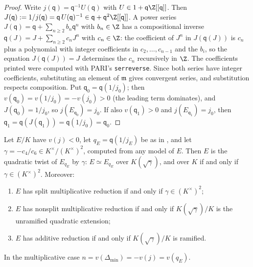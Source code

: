 \begin{proof}
Write $j(\mathsf q)=\mathsf q^{-1}U(\mathsf q)$ with $U\in1+\mathsf q\Z[[\mathsf q]]$. Then $J(\mathsf q):=1/j(\mathsf q)=\mathsf q\,U(\mathsf q)^{-1}\in\mathsf q+\mathsf q^2\Z[[\mathsf q]]$. A power
series $J(\mathsf q)=\mathsf q+\sum_{n\ge2}b_n\mathsf q^n$ with $b_n\in\Z$ has a compositional inverse $\mathsf q(J)=J+\sum_{n\ge2}c_nJ^n$ with $c_n\in\Z$: the
coefficient of $J^n$ in $J(\mathsf q(J))$ is $c_n$ plus a polynomial with integer coefficients in $c_2,\dots,c_{n-1}$ and the $b_i$,
so the equation $J(\mathsf q(J))=J$ determines the $c_n$ recursively in $\Z$. The coefficients printed were computed with PARI's
\texttt{serreverse}. Since both series have integer coefficients, substituting an element of $\mathfrak m$ gives convergent
series, and substitution respects composition. Put $\mathsf q_0=\mathsf q(1/j_0)$; then $v(\mathsf q_0)=v(1/j_0)=-v(j_0)>0$ (the leading term
dominates), and $J(\mathsf q_0)=1/j_0$, so $j(E_{\mathsf q_0})=j_0$. If also $v(\mathsf q_1)>0$ and $j(E_{\mathsf q_1})=j_0$, then
$\mathsf q_1=\mathsf q(J(\mathsf q_1))=\mathsf q(1/j_0)=\mathsf q_0$.
\end{proof}

\begin{theorem}\label{thm:reduction:tate-uniformisation}
Let $E/K$ have $v(j)<0$, let $q_E=\mathsf q(1/j_E)$ be as in , and let
$\gamma=-c_4/c_6\in K^\times/(K^\times)^2$, computed from any model of $E$. Then $E$ is the quadratic twist of $E_{q_E}$ by
$\gamma$: $E\simeq E_{q_E}$ over $K(\sqrt\gamma)$, and over $K$ if and only if $\gamma\in(K^\times)^2$. Moreover:
\begin{enumerate}[label=(\roman*)]
\item $E$ has split multiplicative reduction if and only if $\gamma\in(K^\times)^2$;
\item $E$ has nonsplit multiplicative reduction if and only if $K(\sqrt\gamma)/K$ is the unramified quadratic extension;
\item $E$ has additive reduction if and only if $K(\sqrt\gamma)/K$ is ramified.
\end{enumerate}
In the multiplicative case $n=v(\Delta_{\min})=-v(j)=v(q_E)$.
\end{theorem}

